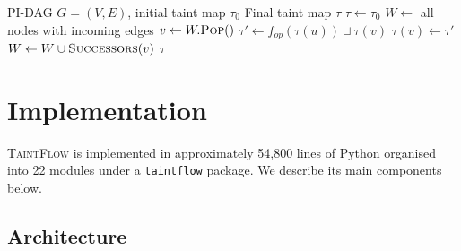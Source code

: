 \documentclass[11pt]{article}
\begin{document}
\begin{algorithm}[t]
\caption{Worklist fixpoint for taint propagation}\label{alg:worklist}
\begin{algorithmic}[1]
\Require PI-DAG $G = (V, E)$, initial taint map $\tau_0$
\Ensure Final taint map $\tau$
\State $\tau \gets \tau_0$
\State $W \gets$ all nodes with incoming edges
  \State $v \gets W.\textsc{Pop}()$
    \State $\tau' \gets f_{\mathit{op}}(\tau(u)) \sqcup \tau(v)$
      \State $\tau(v) \gets \tau'$
      \State $W \gets W \cup \textsc{Successors}(v)$
    \EndIf
  \EndFor
\EndWhile
\State \Return $\tau$
\end{algorithmic}
\end{algorithm}

\section{Implementation}\label{sec:impl}

\textsc{TaintFlow} is implemented in approximately 54,800 lines of
Python organised into 22 modules under a \texttt{taintflow} package.
We describe its main components below.

\subsection{Architecture}
\end{document}
